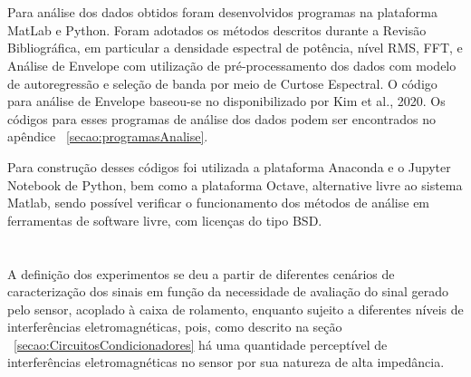 \documentclass[
	12pt,				
	oneside,			
	a4paper,			
	english,			
	brazil,			
	]{abntex2ppgsi}
\begin{document}
\section{}

Para análise dos dados obtidos foram desenvolvidos programas na plataforma MatLab e Python. Foram adotados os métodos descritos durante a Revisão Bibliográfica, em particular a densidade espectral de potência, nível RMS, FFT, e Análise de Envelope com utilização de pré-processamento dos dados com modelo de autoregressão e seleção de banda por meio de Curtose Espectral. O código para análise de Envelope baseou-se no disponibilizado por Kim et al., 2020. Os códigos para esses programas de análise dos dados podem ser encontrados no apêndice ~\ref{secao:programasAnalise}.

Para construção desses códigos foi utilizada a plataforma Anaconda e o Jupyter Notebook de Python, bem como a plataforma Octave, alternative livre ao sistema Matlab, sendo possível verificar o funcionamento dos métodos de análise em ferramentas de software livre, com licenças do tipo BSD. 

\section{}

A definição dos experimentos se deu a partir de diferentes cenários de caracterização dos sinais em função da necessidade de avaliação do sinal gerado pelo sensor, acoplado à caixa de rolamento, enquanto sujeito a diferentes níveis de interferências eletromagnéticas, pois, como descrito na seção ~\ref{secao:CircuitosCondicionadores} há uma quantidade perceptível de interferências eletromagnéticas no sensor por sua natureza de alta impedância.


\end{document}
